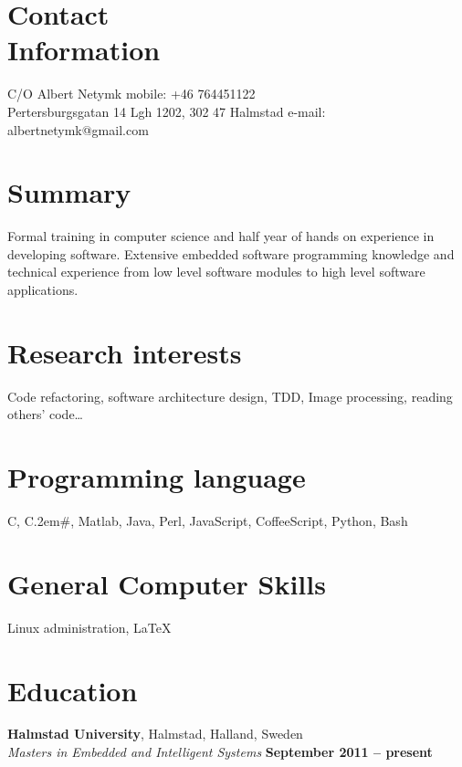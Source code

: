 \documentclass[margin,line]{resume}
\begin{document}
\begin{resume}
	\section{\mysidestyle Contact\\Information}
	C/O Albert Netymk													\hfill mobile: +46 764451122         \vspace{0mm}\\\vspace{0mm}%
	Pertersburgsgatan 14 Lgh 1202, 302 47 Halmstad						\hfill e-mail:  albertnetymk@gmail.com  \vspace{0mm}\\\vspace{-4.5mm}%
	                                                 

	\section{\mysidestyle Summary}
		Formal training in computer science and half year of hands on experience in developing software.
		Extensive embedded software programming knowledge and technical experience from low level software modules to high level software 
		applications.

	\section{\mysidestyle Research interests} 
		Code refactoring, software architecture design, TDD, Image processing, reading others' code\ldots

	\section{\mysidestyle Programming language} 
	C, C\raise.2em\hbox{{\scriptsize\#}}, Matlab, Java, Perl, JavaScript, CoffeeScript, Python, Bash

	\section{\mysidestyle General Computer Skills} 
		Linux administration, \LaTeX

	\section{\mysidestyle Education}

		\textbf{Halmstad University}, Halmstad, Halland, Sweden \vspace{2mm}\\\vspace{1mm}%
		\textsl{Masters in Embedded and Intelligent Systems} \hfill \textbf{ September 2011 -- present}\vspace{-3mm}\\\vspace{-1mm}%


\end{resume}
\end{document}
